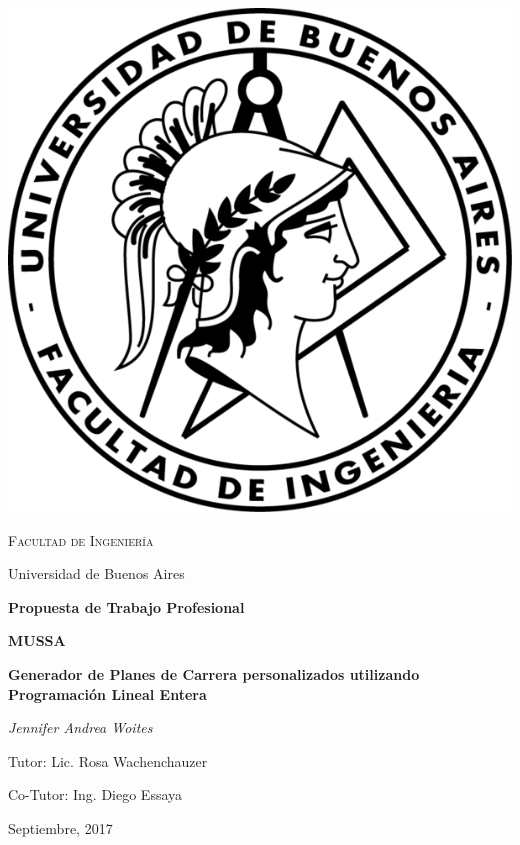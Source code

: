 \documentclass[a4paper]{article}
\begin{document}

\begin{titlepage}
	\centering
	\includegraphics{Imagenes/logo_fiuba.png}\par\vspace{1cm}
	{\scshape\LARGE Facultad de Ingeniería \par
	Universidad de Buenos Aires  \par}
	\vspace{1.5cm}
	{\Large\bfseries Propuesta de Trabajo Profesional\par}
	\vspace{1.5cm}
	{\huge\bfseries MUSSA \par}
	\vspace{0.5cm}
	{\huge\bfseries Generador de Planes de Carrera personalizados utilizando Programación Lineal Entera \par}
	\vspace{1cm}
	{\Large\itshape Jennifer Andrea Woites\par}
	\vfill
	{\Large
	Tutor: Lic. Rosa Wachenchauzer \par
	\vspace{0.3cm}
	Co-Tutor: Ing. Diego Essaya}
	\vfill
	{\large Septiembre, 2017 \par}
\end{titlepage}
\end{document}
